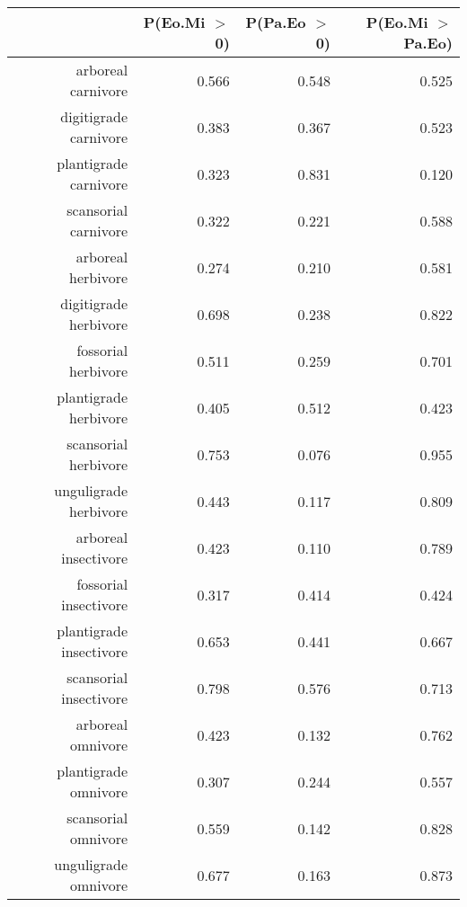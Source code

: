 \begin{table}[ht]
\centering
\begin{tabular}{rrrr}
  \hline
 & P(Eo.Mi $>$ 0) & P(Pa.Eo $>$ 0) & P(Eo.Mi $>$ Pa.Eo) \\ 
  \hline
arboreal carnivore & 0.566 & 0.548 & 0.525 \\ 
  digitigrade carnivore & 0.383 & 0.367 & 0.523 \\ 
  plantigrade carnivore & 0.323 & 0.831 & 0.120 \\ 
  scansorial carnivore & 0.322 & 0.221 & 0.588 \\ 
  arboreal herbivore & 0.274 & 0.210 & 0.581 \\ 
  digitigrade herbivore & 0.698 & 0.238 & 0.822 \\ 
  fossorial herbivore & 0.511 & 0.259 & 0.701 \\ 
  plantigrade herbivore & 0.405 & 0.512 & 0.423 \\ 
  scansorial herbivore & 0.753 & 0.076 & 0.955 \\ 
  unguligrade herbivore & 0.443 & 0.117 & 0.809 \\ 
  arboreal insectivore & 0.423 & 0.110 & 0.789 \\ 
  fossorial insectivore & 0.317 & 0.414 & 0.424 \\ 
  plantigrade insectivore & 0.653 & 0.441 & 0.667 \\ 
  scansorial insectivore & 0.798 & 0.576 & 0.713 \\ 
  arboreal omnivore & 0.423 & 0.132 & 0.762 \\ 
  plantigrade omnivore & 0.307 & 0.244 & 0.557 \\ 
  scansorial omnivore & 0.559 & 0.142 & 0.828 \\ 
  unguligrade omnivore & 0.677 & 0.163 & 0.873 \\ 
   \hline
\end{tabular}
\label{tab:origin_plant}
\end{table}
